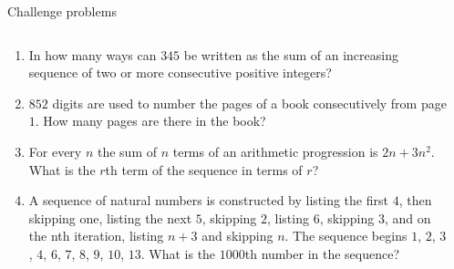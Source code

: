\documentclass[9pt,aspectratio=169]{beamer}
\begin{document}
\begin{frame}{Challenge problems}
  \begin{columns}[T]
    \begin{column}{0.5\textwidth}
      \begin{enumerate}
        \item In how many ways can $345$ be written as the sum of an increasing sequence of two or more consecutive positive integers? %
        \item $852$ digits are used to number the pages of a book consecutively from page $1$. How many pages
        are there in the book? %
        \item For every $n$ the sum of $n$ terms of an arithmetic progression is $2n + 3n^2$. What is the $r$th term of
        the sequence in terms of $r$?
        \item A sequence of natural numbers is constructed by listing the first
        $4$, then skipping one, listing the next $5$, skipping $2$, listing $6$, skipping $3$, and on the nth
        iteration, listing $n + 3$ and skipping $n$. The sequence begins $1$, $2$, $3$, $4$, $6$, $7$, $8$, $9$, $10$, $13$.
        What is the $1000$th number in the sequence? %
      \end{enumerate}
    \end{column}
    \begin{column}{0.5\textwidth}
    \end{column}
  \end{columns}
\end{frame}

\end{document}
